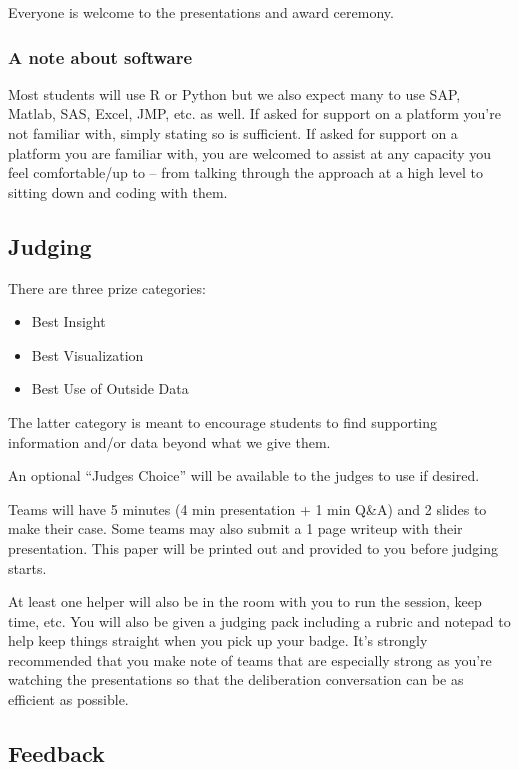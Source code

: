 \documentclass[]{article}
\providecommand{\tightlist}{%
  \setlength{\itemsep}{0pt}\setlength{\parskip}{0pt}}
\begin{document}
Everyone is welcome to the presentations and award ceremony.

\hypertarget{a-note-about-software}{%
\subsubsection{A note about software}\label{a-note-about-software}}

Most students will use R or Python but we also expect many to use SAP,
Matlab, SAS, Excel, JMP, etc. as well. If asked for support on a
platform you're not familiar with, simply stating so is sufficient. If
asked for support on a platform you are familiar with, you are welcomed
to assist at any capacity you feel comfortable/up to -- from talking
through the approach at a high level to sitting down and coding with
them.

\hypertarget{judging}{%
\subsection{Judging}\label{judging}}

There are three prize categories:

\begin{itemize}
\tightlist
\item
  Best Insight
\item
  Best Visualization
\item
  Best Use of Outside Data
\end{itemize}

The latter category is meant to encourage students to find supporting
information and/or data beyond what we give them.

An optional ``Judges Choice'' will be available to the judges to use if
desired.

Teams will have 5 minutes (4 min presentation + 1 min Q\&A) and 2 slides
to make their case. Some teams may also submit a 1 page writeup with
their presentation. This paper will be printed out and provided to you
before judging starts.

At least one helper will also be in the room with you to run the
session, keep time, etc. You will also be given a judging pack including
a rubric and notepad to help keep things straight when you pick up your
badge. It's strongly recommended that you make note of teams that are
especially strong as you're watching the presentations so that the
deliberation conversation can be as efficient as possible.

\hypertarget{feedback}{%
\subsection{Feedback}\label{feedback}}
\end{document}
